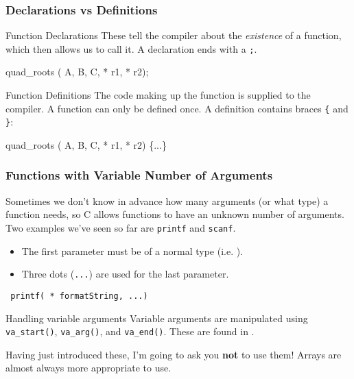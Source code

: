 \documentclass[smaller,table]{beamer} %
\begin{document}
\begin{frame}[fragile]
\frametitle{Declarations vs Definitions}
\begin{block}{Function Declarations}
These tell the compiler about the \emph{existence} of a function, which then
allows us to call it. A declaration ends with a {\tt ;}.
\begin{semiverbatim}
 quad_roots ( A,  B,  C,
                 * r1,  * r2);
\end{semiverbatim}
\end{block}

\begin{block}{Function Definitions}
The code making up the function is supplied to the compiler. A function can only be defined once. A definition contains braces {\tt \{} and {\tt \}}:
\begin{semiverbatim}
 quad_roots ( A,  B,  C,
                 * r1,  * r2)
\{...\}
\end{semiverbatim}
\end{block}
\end{frame}

\begin{frame}
\frametitle{Functions with Variable Number of Arguments}
Sometimes we don't know in advance how many arguments (or what type) a function needs, so C allows functions to have an unknown number of arguments. Two examples we've seen so far are {\tt printf} and {\tt scanf}.

\begin{itemize}
\item The first parameter must be of a normal type (i.e. ).
\item Three dots ({\tt ...}) are used for the last parameter.
\end{itemize}
\begin{center}
{\tt {} printf( * formatString, ...)}
\end{center}
\begin{block}{Handling variable arguments}
Variable arguments are manipulated using {\tt va\_start()}, {\tt va\_arg()},
and {\tt va\_end()}. These are found in .
\end{block}

\begin{alertblock}{}
Having just introduced these, I'm going to ask you {\bf not} to use them! Arrays are almost always more appropriate to use.
\end{alertblock}
\end{frame}
\end{document}
